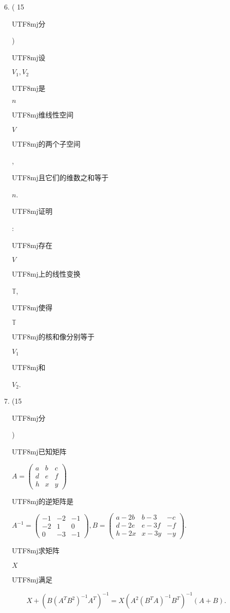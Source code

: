 \documentclass[10pt]{article}
\begin{document}
\begin{enumerate}
  \setcounter{enumi}{5}
  \item ( 15 \begin{CJK}{UTF8}{mj}分\end{CJK}) \begin{CJK}{UTF8}{mj}设\end{CJK} $V_{1}, V_{2}$ \begin{CJK}{UTF8}{mj}是\end{CJK} $n$ \begin{CJK}{UTF8}{mj}维线性空间\end{CJK} $V$ \begin{CJK}{UTF8}{mj}的两个子空间\end{CJK}, \begin{CJK}{UTF8}{mj}且它们的维数之和等于\end{CJK} $n$. \begin{CJK}{UTF8}{mj}证明\end{CJK}: \begin{CJK}{UTF8}{mj}存在\end{CJK} $V$ \begin{CJK}{UTF8}{mj}上的线性变换\end{CJK} $\mathbb{T}$, \begin{CJK}{UTF8}{mj}使得\end{CJK} $\mathbb{T}$ \begin{CJK}{UTF8}{mj}的核和像分别等于\end{CJK} $V_{1}$ \begin{CJK}{UTF8}{mj}和\end{CJK} $V_{2}$.

  \item (15\begin{CJK}{UTF8}{mj}分\end{CJK}) \begin{CJK}{UTF8}{mj}已知矩阵\end{CJK} $A=\left(\begin{array}{lll}a & b & c \\ d & e & f \\ h & x & y\end{array}\right)$ \begin{CJK}{UTF8}{mj}的逆矩阵是\end{CJK} $A^{-1}=\left(\begin{array}{ccc}-1 & -2 & -1 \\ -2 & 1 & 0 \\ 0 & -3 & -1\end{array}\right), B=\left(\begin{array}{ccc}a-2 b & b-3 & -c \\ d-2 e & e-3 f & -f \\ h-2 x & x-3 y & -y\end{array}\right)$. \begin{CJK}{UTF8}{mj}求矩阵\end{CJK} $X$ \begin{CJK}{UTF8}{mj}满足\end{CJK}

\end{enumerate}
$$
X+\left(B\left(A^{T} B^{2}\right)^{-1} A^{T}\right)^{-1}=X\left(A^{2}\left(B^{T} A\right)^{-1} B^{T}\right)^{-1}(A+B) .
$$
\end{document}
